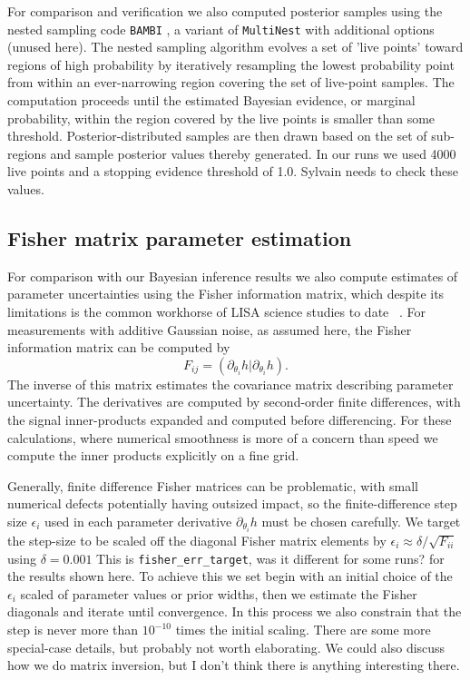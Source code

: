 \documentclass[aps,showpacs,twocolumn,prd,superscriptaddress,nofootinbib]{revtex4-1}
\newcommand{\be}{\begin{equation}}
\newcommand{\ee}{\end{equation}}
\newcommand{\jgb}[1]{{\color{DarkGreen} #1}}
\begin{document}
For comparison and verification we also computed posterior samples using the nested sampling code \texttt{BAMBI} \cite{Graff+2012}, a variant of \texttt{MultiNest} \cite{Feroz+2009b} with additional options (unused here).  The nested sampling algorithm evolves a set of 'live points' toward regions of high probability by iteratively resampling the lowest probability point from within an ever-narrowing region covering the set of live-point samples.  The computation proceeds until the estimated Bayesian evidence, or marginal probability, within the region covered by the live points is smaller than some threshold.  Posterior-distributed samples are then drawn based on the set of sub-regions and sample posterior values thereby generated. In our runs we used 4000 live points and a stopping evidence threshold of 1.0. \jgb{Sylvain needs to check these values.}




\subsection{Fisher matrix parameter estimation}
\label{sec:Fisher}

For comparison with our Bayesian inference results we also compute estimates of parameter uncertainties using the Fisher information matrix, which despite its limitations is the common workhorse of LISA science studies to date ~\cite{Vallisneri08}. For measurements with additive Gaussian noise, as assumed here, the Fisher information matrix can be computed by
\be
F_{ij}=\left( \partial_{\theta_i} h| \partial_{\theta_i} h \right).
\ee
The inverse of this matrix estimates the covariance matrix describing parameter uncertainty. 
The derivatives are computed by second-order finite differences, with the signal inner-products expanded and computed before differencing. For these calculations, where numerical smoothness is more of a concern than speed we compute the inner products explicitly on a fine grid.

Generally, finite difference Fisher matrices can be problematic, with small numerical defects potentially having outsized impact, so the finite-difference step size $\epsilon_i$ used in each parameter derivative $\partial_{\theta_i}h$ must be chosen carefully. We target the step-size to be scaled off the diagonal Fisher matrix elements by ${\epsilon_i}\approx\delta/\sqrt{F_{ii}}$ using $\delta=0.001$ \jgb{This is \texttt{fisher\_err\_target}, was it different for some runs?}  for the results shown here.  To achieve this we set begin with an initial choice of the $\epsilon_i$ scaled of parameter values or prior widths, then we estimate the Fisher diagonals and iterate until convergence. In this process we also constrain that the step is never more than $10^{-10}$ times the initial scaling. \jgb{There are some more special-case details, but probably not worth elaborating.  We could also discuss how we do matrix inversion, but I don't think there is anything interesting there.}
\end{document}
